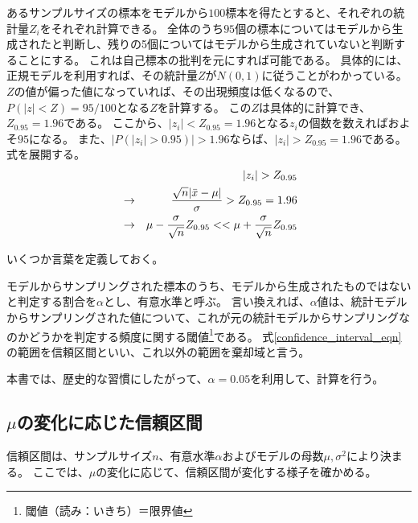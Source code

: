 あるサンプルサイズの標本をモデルから$100$標本を得たとすると、それぞれの統計量$Z_i$をそれぞれ計算できる。
全体のうち$95$個の標本についてはモデルから生成されたと判断し、残りの5個についてはモデルから生成されていないと判断することにする。
これは自己標本の批判を元にすれば可能である。
具体的には、正規モデルを利用すれば、その統計量$Z$が$N(0,1)$に従うことがわかっている。
$Z$の値が偏った値になっていれば、その出現頻度は低くなるので、$P(|z|<Z)=95/100$となる$Z$を計算する。
この$Z$は具体的に計算でき、$Z_{0.95}=1.96$である。
ここから、$|z_i|<Z_{0.95}=1.96$となる$z_i$の個数を数えればおよそ$95$になる。
また、$|P(|z_i|>0.95)| > 1.96$ならば、$|z_i|>Z_{0.95}=1.96$である。
式を展開する。
\begin{eqnarray}
    & &|z_i| > Z_{0.95} \notag \\
    &\rightarrow& \frac{\sqrt{n}|\bar{x}-\mu|}{\sigma} > Z_{0.95} = 1.96  \notag \\
    &\rightarrow& \mu-\frac{\sigma}{\sqrt{n}}Z_{0.95} < < \mu+\frac{\sigma}{\sqrt{n}}Z_{0.95} \label{confidence_interval_eqn}
\end{eqnarray}

いくつか言葉を定義しておく。
\begin{defi}
    モデルからサンプリングされた標本のうち、モデルから生成されたものではないと判定する割合を$\alpha$とし、有意水準と呼ぶ。
    言い換えれば、$\alpha$値は、統計モデルからサンプリングされた値について、これが元の統計モデルからサンプリングなのかどうかを判定する頻度に関する閾値\footnote{閾値（読み：いきち）＝限界値}である。
    式\eqref{confidence_interval_eqn}の範囲を信頼区間といい、これ以外の範囲を棄却域と言う。
\end{defi}

本書では、歴史的な習慣にしたがって、$\alpha=0.05$を利用して、計算を行う。


\subsection{$\mu$の変化に応じた信頼区間}
信頼区間は、サンプルサイズ$n$、有意水準$\alpha$およびモデルの母数$\mu,\sigma^2$により決まる。
ここでは、$\mu$の変化に応じて、信頼区間が変化する様子を確かめる。

